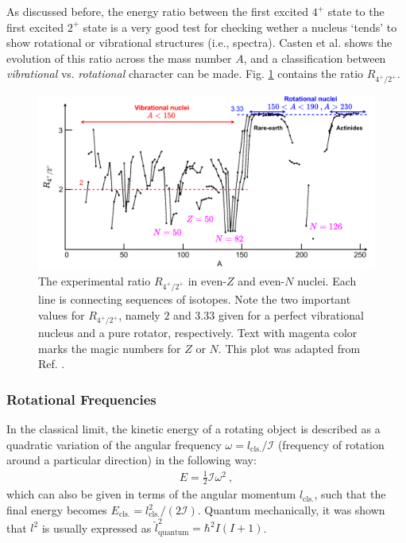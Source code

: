 As discussed before, the energy ratio between the first excited $4^+$ state to the first excited $2^+$ state is a very good test for checking wether a nucleus `tends' to show rotational or vibrational structures (i.e., spectra). Casten et al. \cite{casten2000nuclear} shows the evolution of this ratio across the mass number $A$, and a classification between \emph{vibrational} vs. \emph{rotational} character can be made. Fig. \ref{4state-2state-ratio} contains the ratio $R_{4^+/2^+}$.

\begin{figure}
    \centering
    \includegraphics[scale=0.251]{Chapters/Figures/vibrations_rotations_E42-ratio.pdf}
    \caption{The experimental ratio $R_{4^+/2^+}$ in even-$Z$ and even-$N$ nuclei. Each line is connecting sequences of isotopes. Note the two important values for $R_{4^+/2^+}$, namely $2$ and $3.33$ given for a perfect vibrational nucleus and a pure rotator, respectively. Text with magenta color marks the magic numbers for $Z$ or $N$. This plot was adapted from Ref. \cite{casten2000nuclear}.}
    \label{4state-2state-ratio}
\end{figure}

\subsubsection{Rotational Frequencies}

In the classical limit, the kinetic energy of a rotating object is described as a quadratic variation of the angular frequency $\omega=l_\text{cls.}/\mathcal{I}$ (frequency of rotation around a particular direction) in the following way:
\begin{align}
    E=\frac{1}{2}\mathcal{I}\omega^2\ ,
\end{align}
which can also be given in terms of the angular momentum $l_\text{cls.}$, such that the final energy becomes $E_\text{cls.}=l_\text{cls.}^2/(2\mathcal{I})$. Quantum mechanically, it was shown that $l^2$ is usually expressed as $\hat{l}^2_\text{quantum}=\hbar^2 I(I+1)$.

